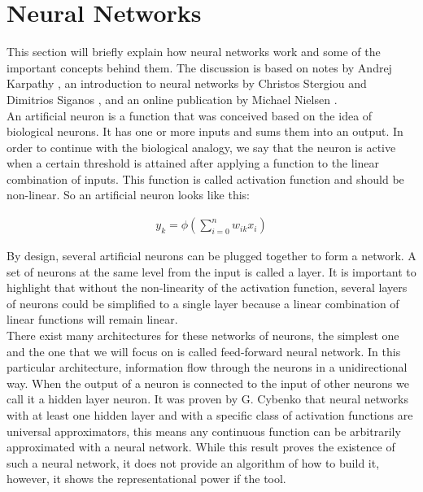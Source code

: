 \section{Neural Networks}

This section will briefly explain how neural networks work and some of the important concepts behind them. The discussion is based on notes by Andrej Karpathy \cite{karpathy}, an introduction to neural networks by Christos Stergiou and Dimitrios Siganos \cite{stergiou}, and an online publication by Michael Nielsen \cite{nielsen}.\\

An artificial neuron is a function that was conceived based on the idea of biological neurons. It has one or more inputs and sums them into an output. In order to continue with the biological analogy, we say that the neuron is active when a certain threshold is attained after applying a function to the linear combination of inputs. This function is called activation function and should be non-linear. So an artificial neuron looks like this:

\begin{align}
y_k=\phi\left(\sum^n_{i=0}w_{ik}x_i\right)\nonumber
\end{align}

By design, several artificial neurons can be plugged together to form a network. A set of neurons at the same level from the input is called a layer. It is important to highlight that without the non-linearity of the activation function, several layers of neurons could be simplified to a single layer because a linear combination of linear functions will remain linear.\\

There exist many architectures for these networks of neurons, the simplest one and the one that we will focus on is called feed-forward neural network. In this particular architecture, information flow through the neurons in a unidirectional way. When the output of a neuron is connected to the input of other neurons we call it a hidden layer neuron. It was proven by G. Cybenko \cite{cybenko:mcss} that neural networks with at least one hidden layer and with a specific class of activation functions are universal approximators, this means any continuous function can be arbitrarily approximated with a neural network. While this result proves the existence of such a neural network, it does not provide an algorithm of how to build it, however, it shows the representational power if the tool.\\

